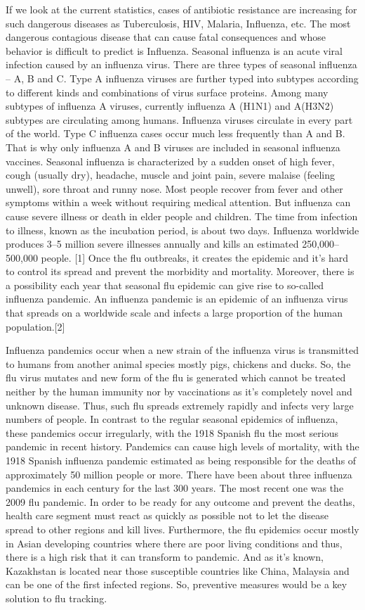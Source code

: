 If we look at the current statistics, cases of antibiotic resistance are increasing for such dangerous diseases as Tuberculosis, HIV, Malaria, Influenza, etc. The most dangerous contagious disease that can cause fatal consequences and whose behavior is difficult to predict is Influenza. Seasonal influenza is an acute viral infection caused by an influenza virus. There are three types of seasonal influenza – A, B and C. Type A influenza viruses are further typed into subtypes according to different kinds and combinations of virus surface proteins. Among many subtypes of influenza A viruses, currently influenza A (H1N1) and A(H3N2) subtypes are circulating among humans. Influenza viruses circulate in every part of the world. Type C influenza cases occur much less frequently than A and B. That is why only influenza A and B viruses are included in seasonal influenza vaccines. Seasonal influenza is characterized by a sudden onset of high fever, cough (usually dry), headache, muscle and joint pain, severe malaise (feeling unwell), sore throat and runny nose. Most people recover from fever and other symptoms within a week without requiring medical attention. But influenza can cause severe illness or death in elder people and children. The time from infection to illness, known as the incubation period, is about two days. Influenza worldwide produces 3–5 million severe illnesses annually and kills an estimated 250,000–500,000 people. [1] Once the flu outbreaks, it creates the epidemic and it’s hard to control its spread and prevent the morbidity and mortality. Moreover, there is a possibility each year that seasonal flu epidemic can give rise to so-called influenza pandemic. An influenza pandemic is an epidemic of an influenza virus that spreads on a worldwide scale and infects a large proportion of the human population.[2]

Influenza pandemics occur when a new strain of the influenza virus is transmitted to humans from another animal species mostly pigs, chickens and ducks. So, the flu virus mutates and new form of the flu is generated which cannot be treated neither by the human immunity nor by vaccinations as it’s completely novel and unknown disease. Thus, such flu spreads extremely rapidly and infects very large numbers of people. In contrast to the regular seasonal epidemics of influenza, these pandemics occur irregularly, with the 1918 Spanish flu the most serious pandemic in recent history. Pandemics can cause high levels of mortality, with the 1918 Spanish influenza pandemic estimated as being responsible for the deaths of approximately 50 million people or more. There have been about three influenza pandemics in each century for the last 300 years. The most recent one was the 2009 flu pandemic. In order to be ready for any outcome and prevent the deaths, health care segment must react as quickly as possible not to let the disease spread to other regions and kill lives. Furthermore, the flu epidemics occur mostly in Asian developing countries where there are poor living conditions and thus, there is a high risk that it can transform to pandemic. And as it’s known, Kazakhstan is located near those susceptible countries like China, Malaysia and can be one of the first infected regions. So, preventive measures would be a key solution to flu tracking.

